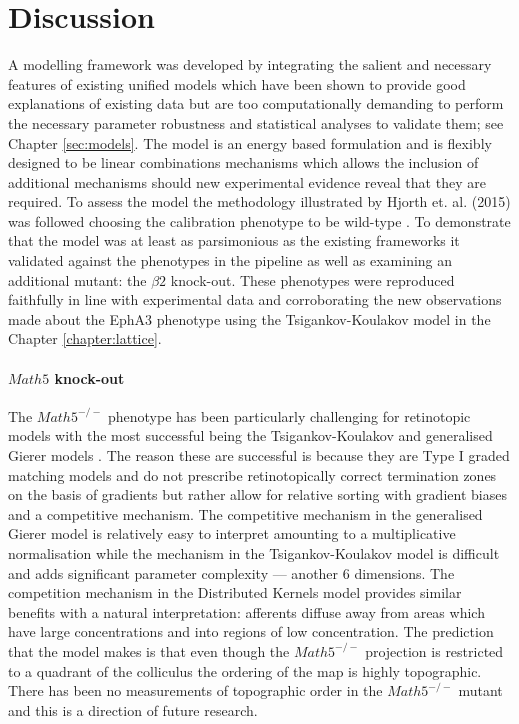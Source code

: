 \section{Discussion}
A modelling framework was developed by integrating the salient and necessary features of existing unified models which have been shown to provide good explanations of existing data but are too computationally demanding to perform the necessary parameter robustness and statistical analyses to validate them; see Chapter \ref{sec:models}. The model is an energy based formulation and is flexibly designed to be linear combinations mechanisms which allows the inclusion of additional mechanisms should new experimental evidence reveal that they are required. To assess the model the methodology illustrated by Hjorth et. al. (2015) was followed choosing the calibration phenotype to be wild-type \cite{Hjorth2015-le}. To demonstrate that the model was at least as parsimonious as the existing frameworks it validated against the phenotypes in the pipeline as well as examining an additional mutant: the $\beta2$ knock-out. These phenotypes were reproduced faithfully in line with experimental data and corroborating the new observations made about the EphA3 phenotype using the Tsigankov-Koulakov model in the Chapter \ref{chapter:lattice}. 
\paragraph{$Math5$ knock-out}
The $Math5^{-/-}$ phenotype has been particularly challenging for retinotopic models with the most successful being the Tsigankov-Koulakov and generalised Gierer models \cite{Triplett2011-jk, Sterratt2013-ev}. The reason these are successful is because they are Type I graded matching models and do not prescribe retinotopically correct termination zones on the basis of gradients but rather allow for relative sorting with gradient biases and a competitive mechanism. The competitive mechanism in the generalised Gierer model is relatively easy to interpret amounting to a multiplicative normalisation while the mechanism in the Tsigankov-Koulakov model is difficult and adds significant parameter complexity --- another 6 dimensions. The competition mechanism in the Distributed Kernels model provides similar benefits with a natural interpretation: afferents diffuse away from areas which have large concentrations and into regions of low concentration. The prediction that the model makes is that even though the $Math5^{-/-}$ projection is restricted to a quadrant of the colliculus the ordering of the map is highly topographic. There has been no measurements of topographic order in the $Math5^{-/-}$ mutant and this is a direction of future research.
